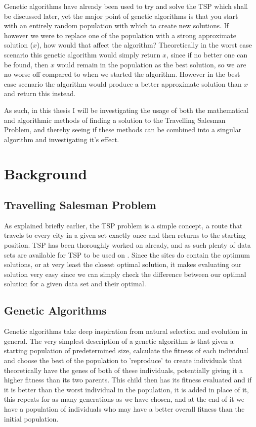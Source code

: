 \documentclass[11pt,a4paper,titlepage]{article}
\begin{document}
Genetic algorithms have already been used to try and solve the TSP which shall be discussed later, yet the major point of genetic algorithms is that you start with an entirely random population with which to create new solutions. If however we were to replace one of the population with a strong approximate solution ($x$), how would that affect the algorithm? Theoretically in the worst case scenario this genetic algorithm would simply return $x$, since if no better one can be found, then $x$ would remain in the population as the best solution, so we are no worse off compared to when we started the algorithm. However in the best case scenario the algorithm would produce a better approximate solution than $x$ and return this instead.

As such, in this thesis I will be investigating the usage of both the mathematical and algorithmic methods of finding a solution to the Travelling Salesman Problem, and thereby seeing if these methods can be combined into a singular algorithm and investigating it's effect.


\section{Background}

\subsection{Travelling Salesman Problem}
As explained briefly earlier, the TSP problem is a simple concept, a route that travels to every city in a given set exactly once and then returns to the starting position. TSP has been thoroughly worked on already, and as such plenty of data sets are available for TSP to be used on \cite{TSPRep1, TSPRep2}. Since the sites do contain the optimum solutions, or at very least the closest optimal solution, it makes evaluating our solution very easy since we can simply check the difference between our optimal solution for a given data set and their optimal.

\subsection{Genetic Algorithms}
Genetic algorithms take deep inspiration from natural selection and evolution in general. The very simplest description of a genetic algorithm is that given a starting population of predetermined size, calculate the fitness of each individual and choose the best of the population to 'reproduce' to create individuals that theoretically have the genes of both of these individuals, potentially giving it a higher fitness than its two parents. This child then has its fitness evaluated and if it is better than the worst individual in the population, it is added in place of it, this repeats for as many generations as we have chosen, and at the end of it we have a population of individuals who may have a better overall fitness than the initial population.
\end{document}
